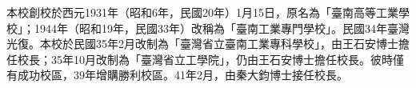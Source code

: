 
本校創校於西元1931年（昭和6年，民國20年）1月15日，原名為「臺南高等工業學校」；1944年（昭和19年，民國33年）改稱為「臺南工業專門學校」。民國34年臺灣光復。本校於民國35年2月改制為「臺灣省立臺南工業專科學校」，由王石安博士擔任校長；35年10月改制為「臺灣省立工學院」，仍由王石安博士擔任校長。彼時僅有成功校區，39年增購勝利校區。41年2月，由秦大鈞博士接任校長。
\begin{comment}
\StartSection{Section}{testpage:ref-cite:section}
45年8月，本校改制為「臺灣省立成功大學」，仍由秦大鈞博士擔任校長；同時增設文理學院及商學院。46年8月，由閻振興博士接任校長。54年1月，由羅雲平博士接任校長。55年增購光復校區。58年10月，將文理學院分為文學院及理學院。60年8月，改制為「國立成功大學」，並由倪超博士接任校長；同年增購建國校區。67年8月，由王唯農博士接任校長。

\StartSubSection{SubSection}{testpage:ref-cite:subsection}
69年8月，夏漢民博士接任校長；同年將商學院更名為管理學院。72年8月，增設醫學院，並增購自強校區及敬業校區。74年增購力行校區部分校地。76年增購歸仁校區，設置航空太空實驗場。77年6月本校醫學院附設醫院正式營運。77年8月，馬哲儒博士接任校長。80年增購自強校區北半部。82年陸續增購台南市「文大五」用地，闢為本校安南校區。

\StartSubSubSection{SubSubSection}{testpage:ref-cite:subsubsection}
96年2月，賴明詔院士接任校長，97年2月教育部公佈「發展國際一流大學及頂尖研究中心計畫」第二梯次的審議結果，本校繼續獲得教育部的肯定與補助，積極朝國際一流大學的目標邁進。97年10月增購歸仁校區北側台糖土地（正式登記為本校管有）。100年2月，黃煌煇博士接任校長。100年4月本校獲得教育部第二期頂尖大學計畫補助，持續朝國際一流大學的目標邁進。104年2月，蘇慧貞博士接任校長。

\InsertFigure
  [scale=0.5,
    caption={Ref用figure}, label={testpage:ref-cite:figure}]
  {./example/abstract/pic/extended-abstract-2.jpg}

\InsertTable
  [caption={Ref用table}, label={testpage:ref-cite:table}]
  {
    \begin{tabular}{llll}
    \hline
    Engine &  &  & OPEL Astra C16SE \\ \hline
    Displacement (cc) &  &  & 1598 \\
    Bore x stroke(mm x mm) &  &  & 79 x 81.5 \\
    Value mechanism &  &  & SOHC \\
    Number of valves &  &  & Intake 4, exhaust 4 \\
    Compression ratio &  &  & 9.8:1 \\
    Torque &  &  & 135/3400 Nm/rpm \\
    Power &  &  & 74/5800 kW/rpm \\
    Ignition sequence &  &  & 1-3-4-2 \\
    Spark plug &  &  & BPR6ES \\
    Fuel &  &  & 95 unleaded gasoline \\
    Cylinder arrangment &  &  & In-line 4 cylinders \\ \hline
    \end{tabular}
  } %


\end{comment}

